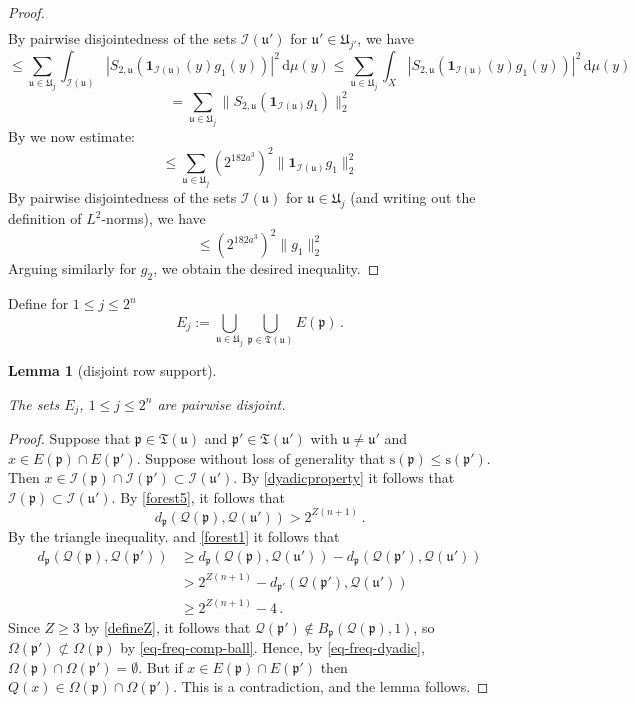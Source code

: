 \documentclass[10pt,a4paper]{article}
\theoremstyle{plain}
\newtheorem{lemma}[theorem]{Lemma}
\theoremstyle{definition}
\numberwithin{equation}{subsection}
\newcommand{\fp}{{\mathfrak p}}
\newcommand{\fu}{{\mathfrak u}}
\newcommand{\fU}{{\mathfrak U}}
\newcommand{\fT}{{\mathfrak T}}
\newcommand{\ps}{{\mathrm{s}}}
\newcommand{\scI}{{\mathcal{I}}} %
\newcommand{\fcc}{{\mathcal{Q}}}
\newcommand{\lean}[1]{}
\newcommand{\leanok}{}
\begin{document}
\begin{proof}
\begin{multline*}
    \end{multline*}
    By pairwise disjointedness of the sets $\scI(\fu')$ for $\fu' \in \fU_{j'}$, we have
    $$
        \le \sum_{\fu \in \fU_j}\int_{\scI(\fu)} |S_{2,\fu} (\mathbf{1}_{\scI(\fu)}(y)g_1(y))|^2 \, \mathrm{d}\mu(y)
        \le \sum_{\fu \in \fU_j}\int_{X} |S_{2,\fu} (\mathbf{1}_{\scI(\fu)}(y)g_1(y))|^2 \, \mathrm{d}\mu(y)
    $$
    $$
       = \sum_{\fu \in \fU_j}\|S_{2,\fu} (\mathbf{1}_{\scI(\fu)}g_1)\|_2^2
    $$
    By  we now estimate:
    $$
        \le \sum_{\fu \in \fU_j}(2^{182a^3})^2 \|\mathbf{1}_{\scI(\fu)}g_1\|_2^2
    $$
    By pairwise disjointedness of the sets $\scI(\fu)$ for $\fu \in \fU_j$ (and writing out the definition of $L^2$-norms), we have
    $$
        \le (2^{182a^3})^2 \|g_1\|_2^2
    $$
    Arguing similarly for $g_2$, we obtain the desired inequality.
\end{proof}

Define for $1 \le j \le 2^n$
$$
    E_j := \bigcup_{\fu \in \fU_j} \bigcup_{\fp \in \fT(\fu)} E(\fp)\,.
$$

\begin{lemma}[disjoint row support]
    \label{disjoint-row-support}
    \leanok
    \lean{TileStructure.Forest.pairwiseDisjoint_rowSupport}
    The sets $E_j$, $1 \le j \le 2^n$ are pairwise disjoint.
\end{lemma}

\begin{proof}
    \leanok
    Suppose that $\fp \in \fT(\fu)$ and $\fp' \in \fT(\fu')$ with $\fu \ne \fu'$ and $x \in E(\fp) \cap E(\fp')$. Suppose without loss of generality that $\ps(\fp) \le \ps(\fp')$. Then $x \in \scI(\fp) \cap \scI(\fp') \subset \scI(\fu')$. By \eqref{dyadicproperty} it follows that $\scI(\fp) \subset \scI(\fu')$. By \eqref{forest5}, it follows that
    $$
        d_{\fp}(\fcc(\fp), \fcc(\fu')) > 2^{Z(n+1)}\,.
    $$
    By the triangle inequality.  and \eqref{forest1} it follows that
    \begin{align*}
        d_{\fp}(\fcc(\fp), \fcc(\fp')) &\ge d_{\fp}(\fcc(\fp), \fcc(\fu')) - d_{\fp}(\fcc(\fp'), \fcc(\fu'))\\
        &> 2^{Z(n+1)} - d_{\fp'}(\fcc(\fp'), \fcc(\fu'))\\
        &\ge 2^{Z(n+1)} - 4\,.
    \end{align*}
    Since $Z \ge 3$ by \eqref{defineZ}, it follows that $\fcc(\fp') \notin B_{\fp}(\fcc(\fp), 1)$, so $\Omega(\fp') \not\subset \Omega(\fp)$ by \eqref{eq-freq-comp-ball}. Hence, by \eqref{eq-freq-dyadic}, $\Omega(\fp) \cap \Omega(\fp') = \emptyset$. But if $x \in E(\fp) \cap E(\fp')$ then $Q(x) \in \Omega(\fp) \cap \Omega(\fp')$. This is a contradiction, and the lemma follows.
\end{proof}
\end{document}
